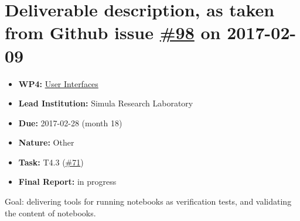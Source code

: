 \section*{\texorpdfstring{Deliverable description, as taken from Github
issue
\href{https://github.com/OpenDreamKit/OpenDreamKit/issues/98}{\#98}
on 2017-02-09}{Deliverable description, as taken from Github issue \#98 on 2017-02-09}}\label{deliverable-description-as-taken-from-github-issue-98-on}

\begin{itemize}
\tightlist
\item
  \textbf{WP4:}
  \href{https://github.com/OpenDreamKit/OpenDreamKit/tree/master/WP4}{User
  Interfaces}
\item
  \textbf{Lead Institution:} Simula Research Laboratory
\item
  \textbf{Due:} 2017-02-28 (month 18)
\item
  \textbf{Nature:} Other
\item
  \textbf{Task:} T4.3
  (\href{https://github.com/OpenDreamKit/OpenDreamKit/issues/71}{\#71})
\item
  \textbf{Final Report:} in progress
\end{itemize}

Goal: delivering tools for running notebooks as verification tests, and
validating the content of notebooks.

